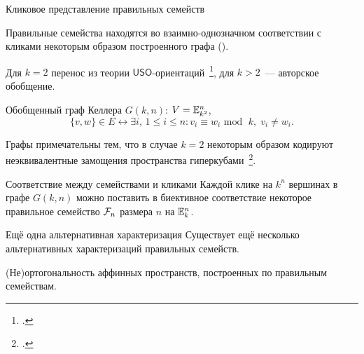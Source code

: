

\begin{frame}{Кликовое представление правильных семейств}
    \begin{coloritemize}
        \item Правильные семейства находятся во взаимно-однозначном соответствии с кликами некоторым образом построенного графа ().
        \item Для $k=2$ перенос из теории $\mathsf{USO}$-ориентаций~\footcite{borzechowski2022universal}, для $k > 2$~--- авторское обобщение.
        \item Обобщенный граф Келлера $G(k, n)$: $V = \mathbb{E}_{k^2}^n$, 
        \[
            \{v, w\} \in E \leftrightarrow \exists i, \, 1 \le i \le n \colon v_i \equiv w_i \text{ mod } \; k, \; v_i \ne w_i.
        \]
        \item Графы примечательны тем, что в случае $k = 2$ некоторым образом кодируют неэквивалентные замощения пространства гиперкубами~\footcite{sikiric2007cube, mathew2013enumerating}.
    \end{coloritemize}
    \begin{mytheorem}{Соответствие между семействами и кликами}
        Каждой клике на $k^n$ вершинах в графе $G(k, n)$ можно поставить в биективное соответствие некоторое правильное семейство $\mathcal{F}_n$ размера $n$ на $\mathbb{E}_k^n$.
    \end{mytheorem}
\end{frame}


\begin{frame}{Ещё одна альтернативная характеризация}
    Существует ещё несколько альтернативных характеризаций правильных семейств.
    \begin{coloritemize}
        \item (Не)ортогональность аффинных пространств, построенных по правильным семействам.
    \end{coloritemize}
\end{frame}


